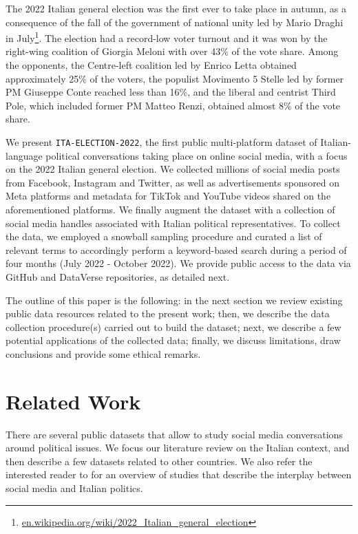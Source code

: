 \documentclass[letterpaper]{article} %
\begin{document}
The 2022 Italian general election was the first ever to take place in autumn, as a consequence of the fall of the government of national unity led by Mario Draghi in July\footnote{\url{en.wikipedia.org/wiki/2022_Italian_general_election}}. The election had a record-low voter turnout and it was won by the right-wing coalition of Giorgia Meloni with over 43\% of the vote share. Among the opponents, the Centre-left coalition led by Enrico Letta obtained approximately 25\% of the voters, the populist Movimento 5 Stelle led by former PM Giuseppe Conte reached less than 16\%, and the liberal and centrist Third Pole, which included former PM Matteo Renzi, obtained almost 8\% of the vote share.

We present \texttt{ITA-ELECTION-2022}, the first public multi-platform dataset of Italian-language political conversations taking place on online social media, with a focus on the 2022 Italian general election. We collected millions of social media posts from Facebook, Instagram and Twitter, as well as advertisements sponsored on Meta platforms and metadata for TikTok and YouTube videos shared on the aforementioned platforms. We finally augment the dataset with a collection of social media handles associated with Italian political representatives. To collect the data, we employed a snowball sampling procedure and curated a list of relevant terms to accordingly perform a keyword-based search during a period of four months (July 2022 - October 2022). We provide public access to the data via GitHub and DataVerse repositories, as detailed next. 

The outline of this paper is the following: in the next section we review existing public data resources related to the present work; then, we describe the data collection procedure(s) carried out to build the dataset; next, we describe a few potential applications of the collected data; finally, we discuss limitations, draw conclusions and provide some ethical remarks.


\section{Related Work}
There are several public datasets that allow to study social media conversations around political issues. We focus our literature review on the Italian context, and then describe a few datasets related to other countries. We also refer the interested reader to \cite{rossi2021nearly} for an overview of studies that describe the interplay between social media and Italian politics.
\end{document}
